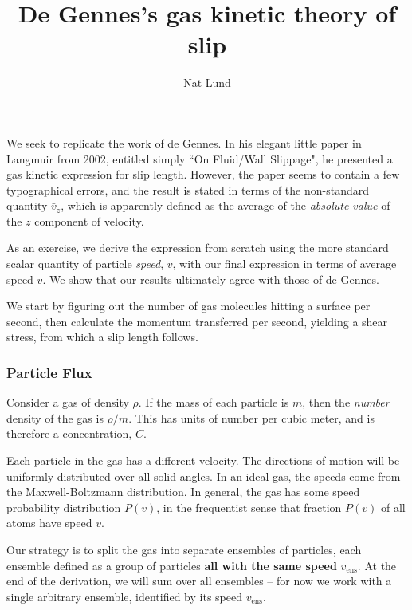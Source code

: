 \documentclass[a4paper]{report}
\title{De Gennes's gas kinetic theory of slip}
\author{Nat Lund}
\newcommand{\vens}{\ensuremath{v_{\mathrm{ens}}}}
\begin{document}
\maketitle

We seek to replicate the work of de Gennes. In his elegant little paper in Langmuir from 2002, entitled simply ``On Fluid/Wall Slippage", he presented a gas kinetic expression for slip length.  However, the paper seems to contain a few typographical errors, and the result is stated in terms of the non-standard quantity $\bar{v}_z$, which is apparently defined as the average of the \emph{absolute value} of the $z$ component of velocity.

As an exercise, we derive the expression from scratch using the more standard scalar quantity of particle \emph{speed}, $v$, with our final expression in terms of average speed $\bar{v}$.  We show that our results ultimately agree with those of de Gennes.%

\vspace{1em}
We start by figuring out the number of gas molecules hitting a surface per second, then calculate the momentum transferred per second, yielding a shear stress, from which a slip length follows.

\subsubsection*{Particle Flux}

Consider a gas of density $\rho$.  If the mass of each particle is $m$, then the \emph{number} density of the gas is $\rho / m$.  This has units of number per cubic meter, and is therefore a concentration, $C$.

Each particle in the gas has a different velocity. The directions of motion will be uniformly distributed over all solid angles. In an ideal gas, the speeds come from the Maxwell-Boltzmann distribution.
In general, the gas has some speed probability distribution $P(v)$, in the frequentist sense that fraction $P(v)$ of all atoms have speed $v$.

\vspace*{1em}
Our strategy is to split the gas into separate ensembles of particles, each ensemble defined as a group of particles \textbf{all with the same speed} $\vens$.
At the end of the derivation, we will sum over all ensembles -- for now we work with a single arbitrary ensemble, identified by its speed $\vens$.
\end{document}
